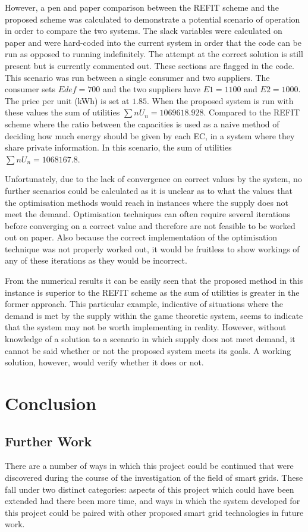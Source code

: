\documentclass[a4paper, notitlepage]{report}
\begin{document}
However, a pen and paper comparison between the REFIT scheme and the proposed
scheme was calculated to demonstrate a potential scenario of operation in order
to compare the two systems. The slack variables were calculated on paper and
were hard-coded into the current system in order that the code can be run as
opposed to running indefinitely. The attempt at the correct solution is still
present but is currently commented out. These sections are flagged in the code.
This scenario was run between a single consumer and two suppliers. The consumer
sets \(Edef= 700\) and the two suppliers have \(E1 = 1100\) and \(E2 = 1000\). The
price per unit (kWh) is set at \(1.85\). When the proposed system is run with
these values the sum of utilities \(∑n U_n = 1069618.928\). Compared to the REFIT
scheme where the ratio between the capacities is used as a naive method of
deciding how much energy should be given by each EC, in a system where they
share private information. In this scenario, the sum of utilities \(∑n U_n =
1068167.8\).

Unfortunately, due to the lack of convergence on correct values by the system, no
further scenarios could be calculated as it is unclear as to what the values
that the optimisation methods would reach in instances where the supply does not
meet the demand. Optimisation techniques can often require several iterations
before converging on a correct value and therefore are not feasible to be worked
out on paper. Also because the correct implementation of the optimisation
technique was not properly worked out, it would be fruitless to show workings of
any of these iterations as they would be incorrect.

From the numerical results it can be easily seen that the proposed method in
this instance is superior to the REFIT scheme as the sum of utilities is greater
in the former approach. This particular example, indicative of situations where
the demand is met by the supply within the game theoretic system, seems to
indicate that the system may not be worth implementing in reality. However,
without knowledge of a solution to a scenario in which supply does not meet
demand, it cannot be said whether or not the proposed system meets its goals. A working
solution, however, would verify whether it does or not.
\part{Conclusion}
\label{sec:orgae31c4e}
\chapter{Further Work}
\label{sec:org561f747}
There are a number of ways in which this project could be continued that were
discovered during the course of the investigation of the field of smart grids.
These fall under two distinct categories: aspects of this project which could
have been extended had there been more time, and ways in which the system
developed for this project could be paired with other proposed smart grid
technologies in future work.
\end{document}
